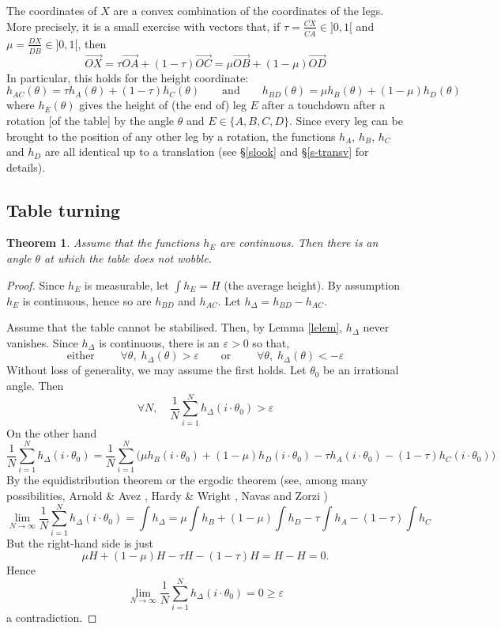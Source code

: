 \documentclass[a4paper,11pt,twoside,leqno]{article}
\newtheorem{teo}{Theorem}[section]
\newcommand{\srl}[1]{\overline{#1}}
\newcommand{\xvc}[1]{\overrightarrow{#1}}
\newcommand{\eps}[0]{\varepsilon}
\numberwithin{equation}{section}
\begin{document}
The coordinates of $X$ are a convex combination of the coordinates of the legs. More precisely, it is a small exercise with vectors that, if $\tau = \frac{ \srl{CX}}{ \srl{CA}}\in ]0,1[$ and $\mu = \frac{ \srl{DX}}{ \srl{DB}}\in ]0,1[$, then
\[
\xvc{OX} = \tau \xvc{OA} + (1-\tau) \xvc{OC} 
= \mu \xvc{OB} + (1-\mu) \xvc{OD}
\]
In particular, this holds for the height coordinate:
\[
h_{AC}(\theta) = \tau h_A(\theta) + (1-\tau) h_C(\theta)
\qquad 
\text{and}
\qquad
h_{BD}(\theta) = \mu h_B(\theta) + (1-\mu) h_D(\theta)
\]
where $h_E(\theta)$ gives the height of (the end of) leg $E$ after a touchdown after a rotation [of the table] by the angle $\theta$ and $E \in \{A,B,C,D\}$. 
Since every leg can be brought to the position of any other leg by a rotation, the functions $h_A$, $h_B$, $h_C$ and $h_D$ are all identical up to a translation (see \S{}\ref{slook} and \S{}\ref{s-transv} for details).


\subsection{Table turning}

\begin{teo}\label{leteo}
Assume that the functions $h_E$ are continuous. Then there is an angle $\theta$ at which the table does not wobble.
\end{teo}
\begin{proof}
Since $h_E$ is measurable, let $\int h_E = H$ (the average height).
By assumption $h_E$ is continuous, hence so are $h_{BD}$ and $h_{AC}$. 
Let $h_\Delta = h_{BD} - h_{AC}$.

Assume that the table cannot be stabilised. Then, by Lemma \ref{lelem}, $h_\Delta$ never vanishes. Since $h_\Delta$ is continuous, there is an $\eps>0$ so that, 
\[
\text{either }
\qquad 
\forall \theta,\; h_{\Delta}(\theta)  > \eps
\qquad 
\text{or }
\qquad
\forall \theta,\; h_{\Delta}(\theta)  < -\eps
\]
Without loss of generality, we may assume the first holds.
Let $\theta_0$ be an irrational angle. 
Then 
\[
\forall N, \quad \frac{1}{N} \sum_{i=1}^N h_\Delta(i \cdot \theta_0) > \eps
\]
On the other hand
\[
\frac{1}{N} \sum_{i=1}^N h_\Delta(i \cdot \theta_0)
=\frac{1}{N}  \sum_{i=1}^N \bigg(
 \mu   h_B(i \cdot \theta_0) +
 (1-\mu)   h_D(i \cdot \theta_0)  -
 \tau  h_A(i \cdot \theta_0) -
 (1-\tau)  h_C(i \cdot \theta_0)
 \bigg)
\]
By the equidistribution theorem or the ergodic theorem (see, among many possibilities, Arnold \& Avez \cite[Appendix 1]{AA}, Hardy \& Wright \cite[Section 23.10]{HW}, Navas \cite[Exercise 2.2.12]{Nav} and Zorzi \cite{Z})
\[
 \lim_{N \to \infty} \frac{1}{N} \sum_{i=1}^N h_\Delta(i \cdot \theta_0)
 = 
 \int h_\Delta = 
 \mu \int  h_B +
 (1-\mu) \int  h_D -
  \tau \int h_A -
 (1-\tau) \int h_C 
\]
But the right-hand side is just 
\[
\mu H + (1-\mu)H - \tau H - (1-\tau)H = H - H = 0.
\]
Hence
\[
 \lim_{N \to \infty} \frac{1}{N} \sum_{i=1}^N h_\Delta(i \cdot \theta_0)
  = 0 \geq \eps
\]
a contradiction.
\end{proof}
\end{document}
